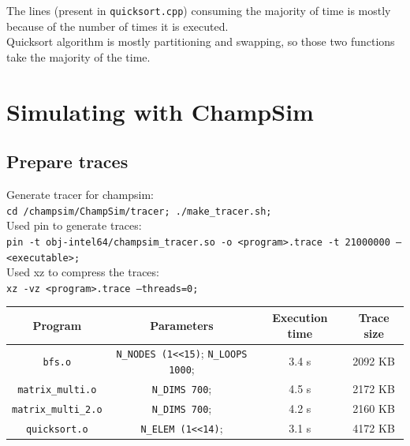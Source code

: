 \documentclass[11pt, swedish, openany]{book}
\begin{document}
The lines (present in \texttt{quicksort.cpp}) consuming the majority of time is mostly because of the number of times it is executed. \\
Quicksort algorithm is mostly partitioning and swapping, so those two functions take the majority of the time.


\chapter{Simulating with ChampSim}
\section{Prepare traces}

Generate tracer for champsim: \\
\texttt{cd /champsim/ChampSim/tracer; ./make\_tracer.sh;} \\
Used pin to generate traces: \\
\texttt{pin -t obj-intel64/champsim\_tracer.so -o <program>.trace -t 21000000 -- <executable>;} \\
Used xz to compress the traces: \\
\texttt{xz -vz <program>.trace --threads=0;}

\begin{table}[H]
    \begin{tabular}{||c||c|c||c||}
        \hline
        Program                     & Parameters                                         & Execution time & Trace size \\
        \hline
        \texttt{bfs.o}              & \texttt{N\_NODES (1<<15)}; \texttt{N\_LOOPS 1000}; & 3.4 s          & 2092 KB    \\
        \hline
        \texttt{matrix\_multi.o}    & \texttt{N\_DIMS 700};                              & 4.5 s          & 2172 KB    \\
        \hline
        \texttt{matrix\_multi\_2.o} & \texttt{N\_DIMS 700};                              & 4.2 s          & 2160 KB    \\
        \hline
        \texttt{quicksort.o}        & \texttt{N\_ELEM (1<<14)};                          & 3.1 s          & 4172 KB    \\
        \hline
    \end{tabular}
\end{table}
\end{document}
